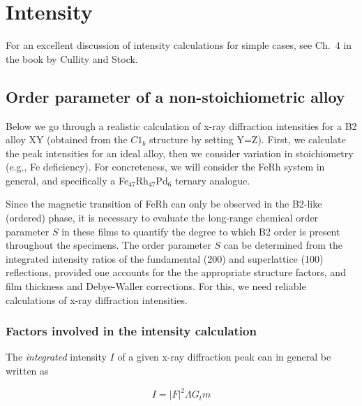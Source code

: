\documentclass[aps,amsmath,amssymb,prb,superscriptaddress,longtable,preprint,fleqn]{revtex4}
\begin{document}
\clearpage
 
\section{Intensity}

For an excellent discussion of intensity calculations for simple cases, see Ch.\ 4 in the book by Cullity and Stock.\cite{cullity01} 

\subsection{Order parameter of a non-stoichiometric  alloy}

Below we go through a realistic calculation of x-ray diffraction intensities for a B2 alloy XY (obtained from the $C1_b$ structure by setting Y=Z). First, we calculate the peak intensities for an ideal alloy, then we consider variation in stoichiometry (e.g., Fe deficiency). For concreteness, we will consider the FeRh system in general, and specifically a Fe$_{47}$Rh$_{47}$Pd$_{6}$ ternary analogue.

Since the magnetic transition of FeRh can only be observed in the B2-like (ordered) phase, it is necessary to evaluate the long-range chemical order parameter $S$ in these films to quantify the degree to which B2 order is present throughout the specimens. The order parameter $S$ can be determined from the integrated intensity ratios of the fundamental (200) and superlattice (100) reflections, provided one accounts for the the appropriate structure factors, and film thickness and Debye-Waller corrections.\cite{fallot38,baranov95,warren69,lott08,cullity01} For this, we need reliable calculations of x-ray diffraction intensities.

\subsubsection{Factors involved in the intensity calculation }

The {\em integrated} intensity $I$ of a given x-ray diffraction peak can in general be written as\cite{warren69,xiao94,xiao95,cullity01}

\begin{equation}
I = |F|^2 \Lambda G_t m
\end{equation}
\end{document}
